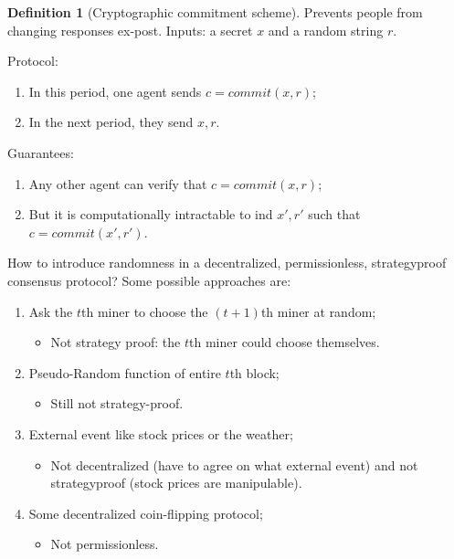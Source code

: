 \documentclass[dvipsnames]{article}
\theoremstyle{definition}
\newtheorem{definition}{Definition}[section]
\theoremstyle{remark}
\begin{document}
\begin{definition}[Cryptographic commitment scheme]
	Prevents people from changing responses ex-post. Inputs: a secret $x$ and a random string $r$.
	
	Protocol:
	\begin{enumerate}
		\item In this period, one agent sends $c = commit(x,r)$;
		\item In the next period, they send $x,r$.
	\end{enumerate}

	Guarantees:
	\begin{enumerate}
		\item Any other agent can verify that $c = commit(x,r)$;
		\item But it is computationally intractable to ind $x',r'$ such that $c = commit(x',r')$.
	\end{enumerate}
\end{definition}

How to introduce randomness in a decentralized, permissionless, strategyproof consensus protocol? Some possible approaches are:
\begin{enumerate}
	\item Ask the $t$th miner to choose the $(t+1)$th miner at random;
	\begin{itemize}
		\item Not strategy proof: the $t$th miner could choose themselves.
	\end{itemize}
	\item Pseudo-Random function of entire $t$th block;
	\begin{itemize}
		\item Still not strategy-proof.
	\end{itemize}
	\item External event like stock prices or the weather;
	\begin{itemize}
		\item Not decentralized (have to agree on what external event) and not strategyproof (stock prices are manipulable).
	\end{itemize}
	\item Some decentralized coin-flipping protocol;
	\begin{itemize}
		\item Not permissionless.
	\end{itemize}
\end{enumerate}
\end{document}
